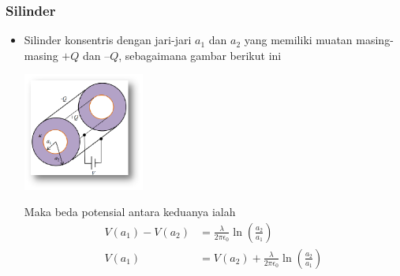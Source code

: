 \documentclass[twocolumn, 11pt]{article}%
\begin{document}
    \subsubsection{Silinder}%
    \begin{itemize}
        \item Silinder konsentris dengan jari-jari $a_1$ dan $a_2$ yang memiliki muatan masing-masing $+Q$ dan $–Q$, sebagaimana gambar berikut ini
            \begin{center}
                \includegraphics[width=150px]{17.png}
            \end{center}
        Maka beda potensial antara keduanya ialah
        \begin{align*}
            V(a_1)-V(a_2) &= \frac{\lambda}{2\pi\epsilon_0}\ln\left(\frac{a_2}{a_1}\right)\\
            V(a_1)&=V(a_2)+\frac{\lambda}{2\pi\epsilon_0}\ln\left(\frac{a_2}{a_1}\right)
        \end{align*}
    \end{itemize}
\end{document}
